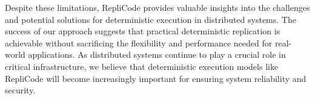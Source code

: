 \documentclass[10pt]{IEEEtran}
\begin{document}
Despite these limitations, RepliCode provides valuable insights into the challenges and potential solutions for deterministic execution in distributed systems. The success of our approach suggests that practical deterministic replication is achievable without sacrificing the flexibility and performance needed for real-world applications. As distributed systems continue to play a crucial role in critical infrastructure, we believe that deterministic execution models like RepliCode will become increasingly important for ensuring system reliability and security.



\end{document}
